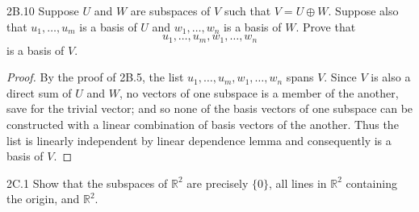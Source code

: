 \documentclass{exam}
\begin{document}
\begin{problem}{2B.10}
    Suppose $U$ and $W$ are subspaces of $V$ such that $V=U\oplus W$. Suppose also that $u_1, \dots, u_m$ is a basis of $U$ and $w_1, \dots, w_n$ is a basis of $W$. Prove that \[
        u_1,\dots, u_m,w_1,\dots,w_n
    \]
    is a basis of $V$.
\end{problem}

\begin{proof}
    By the proof of 2B.5, the list $u_1, \dots, u_m, w_1, \dots, w_n$ spans $V$. Since $V$ is also a direct sum of $U$ and $W$, no vectors of one subspace is a member of the another, save for the trivial vector; and so none of the basis vectors of one subspace can be constructed with a linear combination of basis vectors of the another. Thus the list is linearly independent by linear dependence lemma and consequently is a basis of $V$.
\end{proof}

\begin{problem}{2C.1}
    Show that the subspaces of $\mathbb R^2$ are precisely $\{0\}$, all lines in $\mathbb R^2$ containing the origin, and $\mathbb R^2$.
\end{problem}
\end{document}

